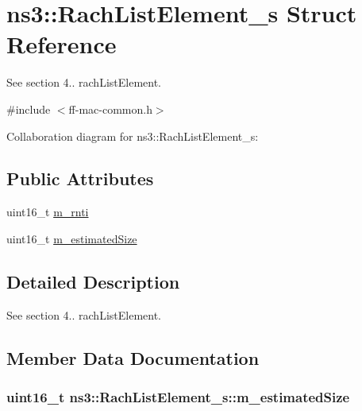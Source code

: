 \hypertarget{structns3_1_1RachListElement__s}{}\section{ns3\+:\+:Rach\+List\+Element\+\_\+s Struct Reference}
\label{structns3_1_1RachListElement__s}


See section 4.. rach\+List\+Element.  




{\ttfamily \#include $<$ff-\/mac-\/common.\+h$>$}



Collaboration diagram for ns3\+:\+:Rach\+List\+Element\+\_\+s\+:
\subsection*{Public Attributes}
\begin{DoxyCompactItemize}
\item 
uint16\+\_\+t \hyperlink{structns3_1_1RachListElement__s_ad4442cd0ac19944b32a86cc7338f59bd}{m\+\_\+rnti}
\item 
uint16\+\_\+t \hyperlink{structns3_1_1RachListElement__s_afb4dc248431f109ba2a6132acd182303}{m\+\_\+estimated\+Size}
\end{DoxyCompactItemize}


\subsection{Detailed Description}
See section 4.. rach\+List\+Element. 

\subsection{Member Data Documentation}
\subsubsection[{\texorpdfstring{m\+\_\+estimated\+Size}{m_estimatedSize}}]{\setlength{\rightskip}{0pt plus 5cm}uint16\+\_\+t ns3\+::\+Rach\+List\+Element\+\_\+s\+::m\+\_\+estimated\+Size}\hypertarget{structns3_1_1RachListElement__s_afb4dc248431f109ba2a6132acd182303}{}\label{structns3_1_1RachListElement__s_afb4dc248431f109ba2a6132acd182303}
